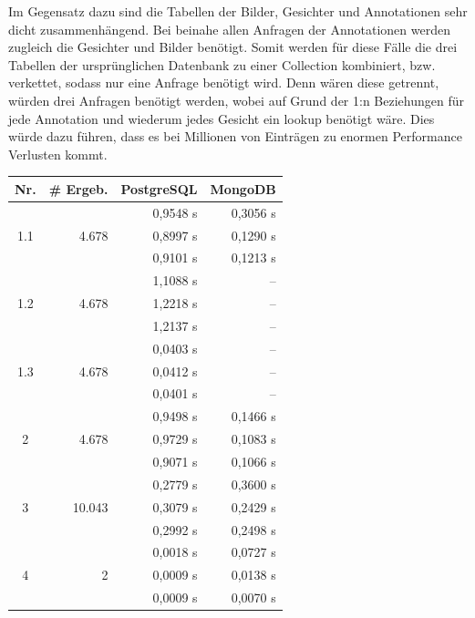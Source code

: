 Im Gegensatz dazu sind die Tabellen der Bilder, Gesichter und Annotationen sehr dicht zusammenhängend.
Bei beinahe allen Anfragen der Annotationen werden zugleich die Gesichter und Bilder benötigt.
Somit werden für diese Fälle die drei Tabellen der ursprünglichen Datenbank zu einer Collection kombiniert, bzw. verkettet, sodass nur eine Anfrage benötigt wird. 
Denn wären diese getrennt, würden drei Anfragen benötigt werden, wobei auf Grund der 1:n Beziehungen für jede Annotation und wiederum jedes Gesicht ein lookup benötigt wäre.
Dies würde dazu führen, dass es bei Millionen von Einträgen zu enormen Performance Verlusten kommt.

\begin{table}[hb]
\scriptsize
\begin{minipage}{0.49\linewidth}
\centering
\begin{tabular}{||c | r | r | r |} 
    \hline
    \textbf{Nr.} & \textbf{\# Ergeb.} & \textbf{PostgreSQL} & \textbf{MongoDB} \\ [0.5ex]
    \hline\hline
    \multirow{3}{*}{1.1} & \multirow{3}{*}{4.678} 
      & 0,9548 s & 0,3056 s \\
    & & 0,8997 s & 0,1290 s \\
    & & 0,9101 s & 0,1213 s \\
    \hline
    \multirow{3}{*}{1.2} & \multirow{3}{*}{4.678} 
      & 1,1088 s & -- \\
    & & 1,2218 s & -- \\
    & & 1,2137 s & -- \\
    \hline
    \multirow{3}{*}{1.3} & \multirow{3}{*}{4.678} 
      & 0,0403 s & -- \\
    & & 0,0412 s & -- \\
    & & 0,0401 s & -- \\
    \hline
    \multirow{3}{*}{2} & \multirow{3}{*}{4.678} 
      & 0,9498 s & 0,1466 s \\
    & & 0,9729 s & 0,1083 s \\
    & & 0,9071 s & 0,1066 s \\
    \hline
    \multirow{3}{*}{3} & \multirow{3}{*}{10.043} 
      & 0,2779 s & 0,3600 s \\
    & & 0,3079 s & 0,2429 s \\
    & & 0,2992 s & 0,2498 s \\
    \hline
    \multirow{3}{*}{4} & \multirow{3}{*}{2} 
      & 0,0018 s & 0,0727 s \\
    & & 0,0009 s & 0,0138 s \\
    & & 0,0009 s & 0,0070 s \\

\end{tabular}
\end{minipage}
\end{table}
